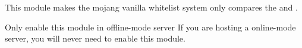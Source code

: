
This module makes the mojang vanilla whitelist system only compares the  and .

\begin{warn}{Only enable this module in offline-mode server}
    If you are hosting a online-mode server, you will never need to enable this module.
\end{warn}